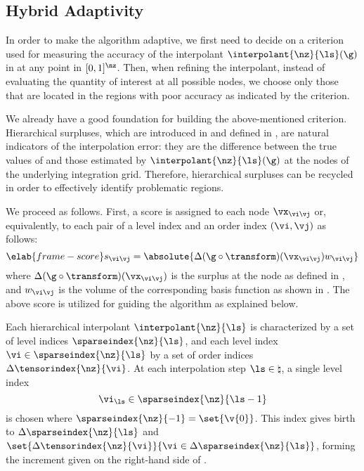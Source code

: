 \subsection{Hybrid Adaptivity}

In order to make the algorithm adaptive, we first need to decide on a criterion
used for measuring the accuracy of the interpolant $\interpolant{\nz}{\ls}(\g)$
in  at any point in $[0, 1]^\nz$. Then, when refining
the interpolant, instead of evaluating the quantity of interest \g at all
possible nodes, we choose only those that are located in the regions with poor
accuracy as indicated by the criterion.

We already have a good foundation for building the above-mentioned criterion.
Hierarchical surpluses, which are introduced in  and
defined in , are natural indicators of the
interpolation error: they are the difference between the true values of \g and
those estimated by $\interpolant{\nz}{\ls}(\g)$ at the nodes of the underlying
integration grid. Therefore, hierarchical surpluses can be recycled in order to
effectively identify problematic regions.

We proceed as follows. First, a score is assigned to each node $\vx_{\vi \vj}$
or, equivalently, to each pair of a level index and an order index $(\vi, \vj)$
as follows:
\begin{equation} \elab{frame-score}
  s_{\vi \vj} = \absolute{\Delta(\g \circ \transform)(\vx_{\vi \vj}) w_{\vi \vj}}
\end{equation}
where $\Delta(\g \circ \transform)(\vx_{\vi \vj})$ is the surplus at the node as
defined in , and $w_{\vi \vj}$ is the volume of
the corresponding basis function as shown in . The above
score is utilized for guiding the algorithm as explained below.

Each hierarchical interpolant $\interpolant{\nz}{\ls}$ is characterized by a set
of level indices $\sparseindex{\nz}{\ls}$, and each level index $\vi \in
\sparseindex{\nz}{\ls}$ by a set of order indices
$\Delta\tensorindex{\nz}{\vi}$. At each interpolation step $\ls \in \natural$, a
single level index
\[
  \vi_{\ls} \in \sparseindex{\nz}{\ls - 1}
\]
is chosen where $\sparseindex{\nz}{-1} = \set{\v{0}}$. This index gives birth to
$\Delta\sparseindex{\nz}{\ls}$ and $\set{\Delta\tensorindex{\nz}{\vi}}{\vi \in
\Delta\sparseindex{\nz}{\ls}}$, forming the increment given on the right-hand
side of .

